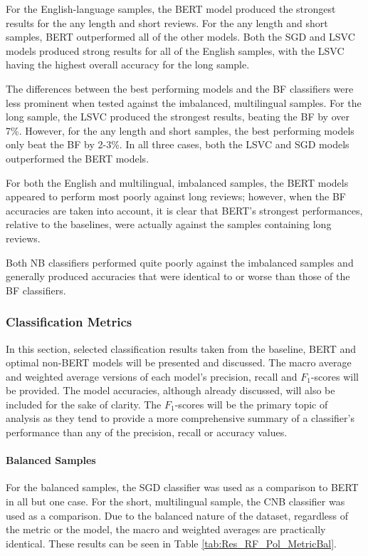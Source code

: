 For the English-language samples, the BERT model produced the strongest results for the any length and short reviews. For the any length and short samples, BERT outperformed all of the other models. Both the SGD and LSVC models produced strong results for all of the English samples, with the LSVC having the highest overall accuracy for the long sample.

The differences between the best performing models and the BF classifiers were less prominent when tested against the imbalanced, multilingual samples. For the long sample, the LSVC produced the strongest results, beating the BF by over 7\%. However, for the any length and short samples, the best performing models only beat the BF by 2-3\%. In all three cases, both the LSVC and SGD models outperformed the BERT models.

For both the English and multilingual, imbalanced samples, the BERT models appeared to perform most poorly against long reviews; however, when the BF accuracies are taken into account, it is clear that BERT's strongest performances, relative to the baselines, were actually against the samples containing long reviews.

Both NB classifiers performed quite poorly against the imbalanced samples and generally produced accuracies that were identical to or worse than those of the BF classifiers.

\subsubsection{Classification Metrics}

In this section, selected classification results taken from the baseline, BERT and optimal non-BERT models will be presented and discussed. The macro average and weighted average versions of each model's precision, recall and $F_1$-scores will be provided. The model accuracies, although already discussed, will also be included for the sake of clarity. The $F_1$-scores will be the primary topic of analysis as they tend to provide a more comprehensive summary of a classifier's performance than any of the precision, recall or accuracy values.

\paragraph{Balanced Samples}

For the balanced samples, the SGD classifier was used as a comparison to BERT in all but one case. For the short, multilingual sample, the CNB classifier was used as a comparison. Due to the balanced nature of the dataset, regardless of the metric or the model, the macro and weighted averages are practically identical. These results can be seen in Table \ref{tab:Res_RF_Pol_MetricBal}.

